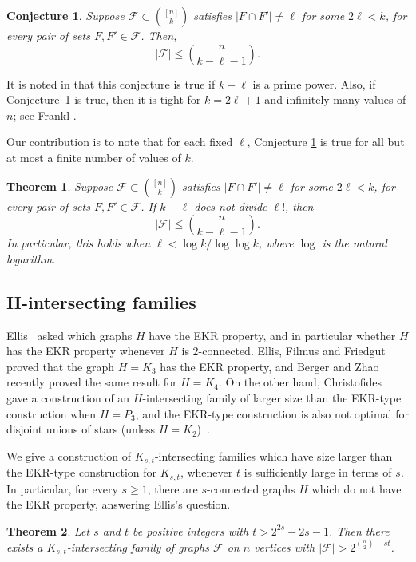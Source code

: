 \documentclass[12pt]{article}
\newtheorem{theorem}{Theorem}
\newtheorem{conjecture}{Conjecture}
\theoremstyle{definition}
\newcommand{\cF}{\mathcal{F}}
\begin{document}
\begin{conjecture}\label{conj:missingoneintconj}
Suppose $\cF \subset \binom{[n]}{k}$ satisfies $|F \cap F'| \neq \ell$ for some $2\ell < k$, for every pair of sets $F, F' \in \cF$. Then, 
\[|\cF| \le \binom{n}{k-\ell-1}.\]
\end{conjecture}

It is noted in \cite{FT} that this conjecture is true if $k-\ell$ is a prime power. Also, if Conjecture~\ref{conj:missingoneintconj} is true, then it is tight for $k=2\ell+1$ and infinitely many values of $n$; see Frankl \cite{F83}.

Our contribution is to note that for each fixed $\ell$, Conjecture \ref{conj:missingoneintconj} is true for all but at most a finite number of values of $k$. 

\begin{theorem}\label{thm:extensionthm}
Suppose $\cF \subset \binom{[n]}{k}$ satisfies $|F \cap F'| \neq \ell$ for some $2\ell < k$, for every pair of sets $F, F' \in \cF$. If $k-\ell$ does not divide $\ell!$, then 
\[|\cF| \le \binom{n}{k-\ell-1}.\]
In particular, this holds when $\ell < \log k/\log\log k$, where $\log$ is the natural logarithm. 
\end{theorem}

\subsection{H-intersecting families}
Ellis~\cite{E} asked which graphs $H$ have the EKR property, and in particular whether $H$ has the EKR property whenever $H$ is $2$-connected. Ellis, Filmus and Friedgut~\cite{EFF} proved that the graph $H=K_3$ has the EKR property, and Berger and Zhao~\cite{BZ} recently proved the same result for  $H=K_4$. On the other hand, Christofides~\cite{C} gave a construction of an $H$-intersecting family of larger size than the EKR-type construction when $H=P_3$, and the EKR-type construction is also not optimal for disjoint unions of stars (unless $H=K_2$)~\cite{AS}. 

We give a construction of $K_{s, t}$-intersecting families which have size larger than the EKR-type construction for $K_{s, t}$, whenever $t$ is sufficiently large in terms of $s$. In particular, for every $s\ge 1$, there are $s$-connected graphs $H$ which do not have the EKR property, answering Ellis's question. 

\begin{theorem}\label{thm:kstintthm}
Let $s$ and $t$ be positive integers with $t > 2^{2s} - 2s - 1$. Then there exists a $K_{s, t}$-intersecting family of graphs $\cF$ on $n$ vertices with $|\cF| > 2^{\binom{n}{2} - st}$.
\end{theorem}
\end{document}
